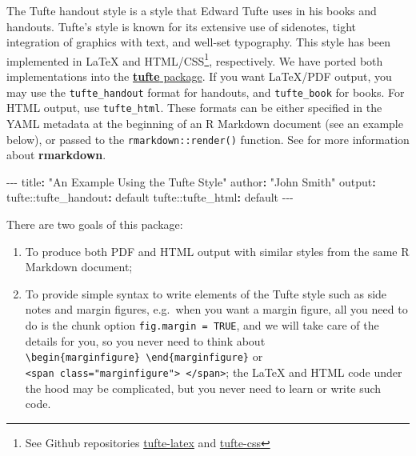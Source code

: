 \documentclass[a4paper,14pt]{tufte-handout}
\newenvironment{Shaded}{}{}
\newcommand{\AttributeTok}[1]{\textcolor[rgb]{0.49,0.56,0.16}{#1}}
\newcommand{\FunctionTok}[1]{\textcolor[rgb]{0.02,0.16,0.49}{#1}}
\newcommand{\KeywordTok}[1]{\textcolor[rgb]{0.00,0.44,0.13}{\textbf{#1}}}
\newcommand{\PreprocessorTok}[1]{\textcolor[rgb]{0.74,0.48,0.00}{#1}}
\newcommand{\StringTok}[1]{\textcolor[rgb]{0.25,0.44,0.63}{#1}}
\providecommand{\tightlist}{%
  \setlength{\itemsep}{0pt}\setlength{\parskip}{0pt}}
\begin{document}
The Tufte handout style is a style that Edward Tufte uses in his books
and handouts. Tufte's style is known for its extensive use of sidenotes,
tight integration of graphics with text, and well-set typography. This
style has been implemented in LaTeX and HTML/CSS\footnote{See Github
  repositories
  \href{https://github.com/tufte-latex/tufte-latex}{tufte-latex} and
  \href{https://github.com/edwardtufte/tufte-css}{tufte-css}},
respectively. We have ported both implementations into the
\href{https://github.com/rstudio/tufte}{\textbf{tufte} package}. If you
want LaTeX/PDF output, you may use the \texttt{tufte\_handout} format
for handouts, and \texttt{tufte\_book} for books. For HTML output, use
\texttt{tufte\_html}. These formats can be either specified in the YAML
metadata at the beginning of an R Markdown document (see an example
below), or passed to the \texttt{rmarkdown::render()} function. See
\citet{R-rmarkdown} for more information about \textbf{rmarkdown}.

\begin{Shaded}
\begin{Highlighting}[]
\PreprocessorTok{{-}{-}{-}}
\FunctionTok{title}\KeywordTok{:}\AttributeTok{ }\StringTok{"An Example Using the Tufte Style"}
\FunctionTok{author}\KeywordTok{:}\AttributeTok{ }\StringTok{"John Smith"}
\FunctionTok{output}\KeywordTok{:}
\AttributeTok{  tufte:}\FunctionTok{:tufte\_handout}\KeywordTok{:}\AttributeTok{ default}
\AttributeTok{  tufte:}\FunctionTok{:tufte\_html}\KeywordTok{:}\AttributeTok{ default}
\PreprocessorTok{{-}{-}{-}}
\end{Highlighting}
\end{Shaded}

There are two goals of this package:

\begin{enumerate}
\def\labelenumi{\arabic{enumi}.}
\tightlist
\item
  To produce both PDF and HTML output with similar styles from the same
  R Markdown document;
\item
  To provide simple syntax to write elements of the Tufte style such as
  side notes and margin figures, e.g.~when you want a margin figure, all
  you need to do is the chunk option \texttt{fig.margin\ =\ TRUE}, and
  we will take care of the details for you, so you never need to think
  about
  \texttt{\textbackslash{}begin\{marginfigure\}\ \textbackslash{}end\{marginfigure\}}
  or
  \texttt{\textless{}span\ class="marginfigure"\textgreater{}\ \textless{}/span\textgreater{}};
  the LaTeX and HTML code under the hood may be complicated, but you
  never need to learn or write such code.
\end{enumerate}
\end{document}
